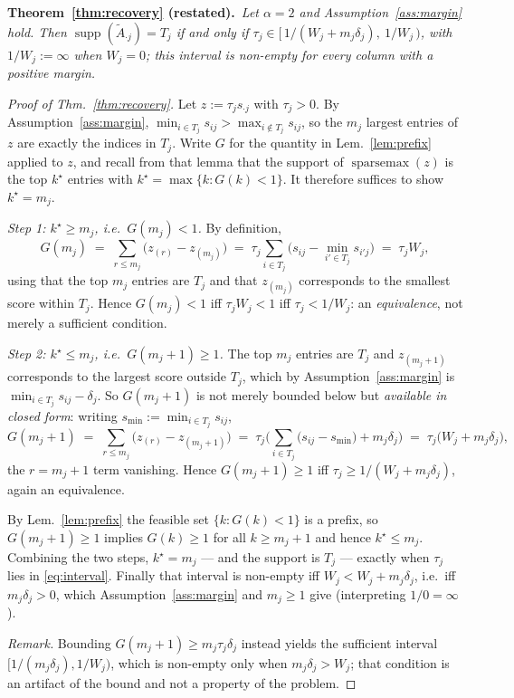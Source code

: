 \documentclass{article}
\newcommand{\supp}{\operatorname{supp}}
\begin{document}
\medskip\noindent\textbf{Theorem~\ref{thm:recovery} (restated).}\ \emph{Let $\alpha=2$ and Assumption~\ref{ass:margin} hold. Then $\supp(\tilde A_{\cdot j}) = T_j$
if and only if $\tau_j \in [\,1/(W_j+m_j\delta_j),\ 1/W_j\,)$, with $1/W_j := \infty$ when
$W_j=0$; this interval is non-empty for every column with a positive margin.}

\begin{proof}[Proof of Thm.~\ref{thm:recovery}]
Let $z := \tau_j s_{\cdot j}$ with $\tau_j > 0$. By Assumption~\ref{ass:margin},
$\min_{i\in T_j} s_{ij} > \max_{i \notin T_j} s_{ij}$, so the $m_j$ largest entries of $z$ are
exactly the indices in $T_j$. Write $G$ for the quantity in Lem.~\ref{lem:prefix} applied to
$z$, and recall from that lemma that the support of $\operatorname{sparsemax}(z)$ is the top
$k^\star$ entries with $k^\star = \max\{k : G(k) < 1\}$. It therefore suffices to show
$k^\star = m_j$.

\emph{Step 1: $k^\star \geq m_j$, i.e.\ $G(m_j) < 1$.} By definition,
\begin{equation*}
G(m_j) \;=\; \sum_{r \leq m_j}\big(z_{(r)} - z_{(m_j)}\big)
\;=\; \tau_j \sum_{i \in T_j}\Big(s_{ij} - \min_{i' \in T_j} s_{i'j}\Big) \;=\; \tau_j W_j ,
\end{equation*}
using that the top $m_j$ entries are $T_j$ and that $z_{(m_j)}$ corresponds to the smallest
score within $T_j$. Hence $G(m_j) < 1$ iff $\tau_j W_j < 1$ iff $\tau_j < 1/W_j$: an
\emph{equivalence}, not merely a sufficient condition.

\emph{Step 2: $k^\star \leq m_j$, i.e.\ $G(m_j{+}1) \geq 1$.} The top $m_j$ entries are $T_j$
and $z_{(m_j+1)}$ corresponds to the largest score outside $T_j$, which by
Assumption~\ref{ass:margin} is $\min_{i\in T_j}s_{ij}-\delta_j$. So $G(m_j{+}1)$ is not merely
bounded below but \emph{available in closed form}: writing $s_{\min}:=\min_{i\in T_j}s_{ij}$,
\begin{equation*}
G(m_j{+}1) \;=\; \sum_{r \leq m_j}\big(z_{(r)} - z_{(m_j+1)}\big)
\;=\; \tau_j\Big(\sum_{i\in T_j}\big(s_{ij}-s_{\min}\big) + m_j\delta_j\Big)
\;=\; \tau_j\big(W_j + m_j\delta_j\big) ,
\end{equation*}
the $r=m_j{+}1$ term vanishing. Hence $G(m_j{+}1)\ge1$ iff $\tau_j \ge 1/(W_j+m_j\delta_j)$,
again an equivalence.

By Lem.~\ref{lem:prefix} the feasible set $\{k : G(k) < 1\}$ is a prefix, so
$G(m_j{+}1) \geq 1$ implies $G(k) \geq 1$ for all $k \geq m_j{+}1$ and hence
$k^\star \leq m_j$. Combining the two steps, $k^\star = m_j$ --- and the support is $T_j$ ---
exactly when $\tau_j$ lies in \eqref{eq:interval}. Finally that interval is non-empty iff
$W_j < W_j + m_j\delta_j$, i.e.\ iff $m_j\delta_j>0$, which Assumption~\ref{ass:margin} and
$m_j\ge1$ give (interpreting $1/0 = \infty$).

\emph{Remark.} Bounding $G(m_j{+}1)\ge m_j\tau_j\delta_j$ instead yields the sufficient interval
$[1/(m_j\delta_j),1/W_j)$, which is non-empty only when $m_j\delta_j>W_j$; that condition is an
artifact of the bound and not a property of the problem.
\end{proof}
\end{document}
